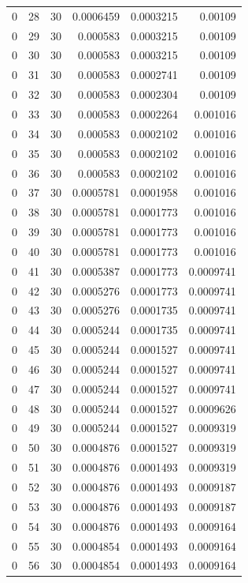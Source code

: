 \begin{tabular}{rrrrrr}
0 & 28 & 30 & 0.0006459 & 0.0003215 & 0.00109 \\
0 & 29 & 30 & 0.000583 & 0.0003215 & 0.00109 \\
0 & 30 & 30 & 0.000583 & 0.0003215 & 0.00109 \\
0 & 31 & 30 & 0.000583 & 0.0002741 & 0.00109 \\
0 & 32 & 30 & 0.000583 & 0.0002304 & 0.00109 \\
0 & 33 & 30 & 0.000583 & 0.0002264 & 0.001016 \\
0 & 34 & 30 & 0.000583 & 0.0002102 & 0.001016 \\
0 & 35 & 30 & 0.000583 & 0.0002102 & 0.001016 \\
0 & 36 & 30 & 0.000583 & 0.0002102 & 0.001016 \\
0 & 37 & 30 & 0.0005781 & 0.0001958 & 0.001016 \\
0 & 38 & 30 & 0.0005781 & 0.0001773 & 0.001016 \\
0 & 39 & 30 & 0.0005781 & 0.0001773 & 0.001016 \\
0 & 40 & 30 & 0.0005781 & 0.0001773 & 0.001016 \\
0 & 41 & 30 & 0.0005387 & 0.0001773 & 0.0009741 \\
0 & 42 & 30 & 0.0005276 & 0.0001773 & 0.0009741 \\
0 & 43 & 30 & 0.0005276 & 0.0001735 & 0.0009741 \\
0 & 44 & 30 & 0.0005244 & 0.0001735 & 0.0009741 \\
0 & 45 & 30 & 0.0005244 & 0.0001527 & 0.0009741 \\
0 & 46 & 30 & 0.0005244 & 0.0001527 & 0.0009741 \\
0 & 47 & 30 & 0.0005244 & 0.0001527 & 0.0009741 \\
0 & 48 & 30 & 0.0005244 & 0.0001527 & 0.0009626 \\
0 & 49 & 30 & 0.0005244 & 0.0001527 & 0.0009319 \\
0 & 50 & 30 & 0.0004876 & 0.0001527 & 0.0009319 \\
0 & 51 & 30 & 0.0004876 & 0.0001493 & 0.0009319 \\
0 & 52 & 30 & 0.0004876 & 0.0001493 & 0.0009187 \\
0 & 53 & 30 & 0.0004876 & 0.0001493 & 0.0009187 \\
0 & 54 & 30 & 0.0004876 & 0.0001493 & 0.0009164 \\
0 & 55 & 30 & 0.0004854 & 0.0001493 & 0.0009164 \\
0 & 56 & 30 & 0.0004854 & 0.0001493 & 0.0009164 \\

\end{tabular}
